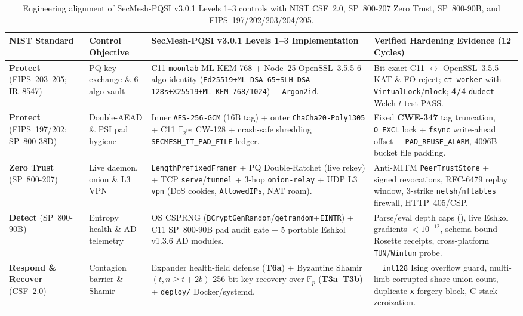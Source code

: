 \documentclass[10pt,letterpaper]{article}
\newcommand{\code}[1]{\texttt{\fontsize{7.8pt}{9.2pt}\selectfont #1}}
\begin{document}
\begin{table}[h!]
\centering
\vspace{-5pt}
\fontsize{7.1pt}{8.4pt}\selectfont
\renewcommand{\arraystretch}{1.04}
\begin{tabularx}{\linewidth}{@{}L{2.35cm} L{2.45cm} Y L{4.20cm}@{}}
\toprule
\textbf{NIST Standard} & \textbf{Control Objective} & \textbf{SecMesh-PQSI v3.0.1 Levels 1--3 Implementation} & \textbf{Verified Hardening Evidence (12 Cycles)} \\
\midrule
\textbf{Protect} (FIPS~203--205; IR~8547) & PQ key exchange \& 6-algo vault & C11 \code{moonlab} ML-KEM-768 + Node~25 OpenSSL~3.5.5 6-algo identity (\code{Ed25519+ML-DSA-65+SLH-DSA-128s+X25519+ML-KEM-768/1024}) + \code{Argon2id}. & Bit-exact C11 $\leftrightarrow$ OpenSSL~3.5.5 KAT \& FO reject; \code{ct-worker} with \code{VirtualLock}/\code{mlock}; \textbf{4/4} \code{dudect} Welch $t$-test PASS. \\
\textbf{Protect} (FIPS~197/202; SP~800-38D) & Double-AEAD \& PSI pad hygiene & Inner \code{AES-256-GCM} (16B tag) + outer \code{ChaCha20-Poly1305} + C11 $\mathbb{F}_{2^{128}}$ CW-128 + crash-safe shredding \code{SECMESH\_IT\_PAD\_FILE} ledger. & Fixed \textbf{CWE-347} tag truncation, \code{O\_EXCL} lock + \code{fsync} write-ahead offset + \code{PAD\_REUSE\_ALARM}, 4096B bucket file padding. \\
\textbf{Zero Trust} (SP~800-207) & Live daemon, onion \& L3 VPN & \code{LengthPrefixedFramer} + PQ Double-Ratchet (live rekey) + TCP \code{serve}/\code{tunnel} + 3-hop \code{onion-relay} + UDP L3 \code{vpn} (DoS cookies, \code{AllowedIPs}, NAT roam). & Anti-MITM \code{PeerTrustStore} + signed revocations, RFC-6479 replay window, 3-strike \code{netsh}/\code{nftables} firewall, HTTP~405/CSP. \\
\textbf{Detect} (SP~800-90B) & Entropy health \& AD telemetry & OS CSPRNG (\code{BCryptGenRandom}/\code{getrandom}+\code{EINTR}) + C11 SP~800-90B pad audit gate + 5 portable Eshkol v1.3.6 AD modules. & Parse/eval depth caps (\code{256}), live Eshkol gradients $<10^{-12}$, schema-bound Rosette receipts, cross-platform \code{TUN}/\code{Wintun} probe. \\
\textbf{Respond \& Recover} (CSF~2.0) & Contagion barrier \& Shamir & Expander health-field defense (\textbf{T6a}) + Byzantine Shamir $(t,n{\ge}t{+}2b)$ 256-bit key recovery over $\mathbb{F}_p$ (\textbf{T3a--T3b}) + \code{deploy/} Docker/systemd. & \code{\_\_int128} Ising overflow guard, multi-limb corrupted-share union count, duplicate-\code{x} forgery block, C stack zeroization. \\
\bottomrule
\end{tabularx}
\vspace{-4pt}
\caption{\scriptsize Engineering alignment of SecMesh-PQSI v3.0.1 Levels 1--3 controls with NIST CSF~2.0, SP~800-207 Zero Trust, SP~800-90B, and FIPS~197/202/203/204/205.}
\label{tab:nist}
\vspace{-7pt}
\end{table}
\end{document}
